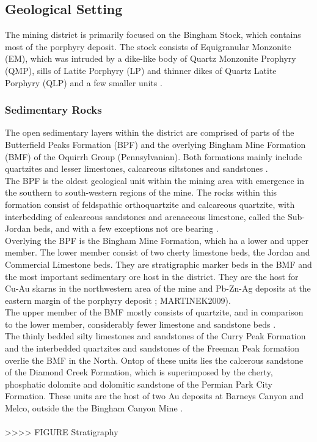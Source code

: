 \documentclass[a4paper,11pt,titlepage]{article}
\begin{document}
\subsection{Geological Setting}

The mining district is primarily focused on the Bingham Stock, which contains most of the porphyry deposit. The stock consists of Equigranular Monzonite (EM), which was intruded by a dike-like body of Quartz Monzonite Prophyry (QMP), sills of Latite Porphyry (LP) and thinner dikes of Quartz Latite Porphyry (QLP) and a few smaller units \citep{Porter2012}.

\subsubsection{Sedimentary Rocks}

The open sedimentary layers within the district are comprised of parts of the Butterfield Peaks Formation (BPF) and the overlying Bingham Mine Formation (BMF) of the Oquirrh Group (Pennsylvanian). Both formations mainly include quartzites and lesser limestones, calcareous siltstones and sandstones \citep{Lanier1978}.
\\The BPF is the oldest geological unit within the mining area with emergence in the southern to south-western regions of the mine. The rocks within this formation consist of feldspathic orthoquartzite and calcareous quartzite, with interbedding of calcareous sandstones and arenaceous limestone, called the Sub-Jordan beds, and with a few exceptions not ore bearing \citep{Lanier1978}.
\\Overlying the BPF is the Bingham Mine Formation, which ha a lower and upper member. The lower member consist of two cherty limestone beds, the Jordan and Commercial Limestone beds. They are stratigraphic marker beds in the BMF and the most important sedimentary ore host in the district. They are the host for Cu-Au skarns in the northwestern area of the mine and Pb-Zn-Ag deposits at the eastern margin of the porphyry deposit \citep{Lanier1978}; MARTINEK2009).
\\The upper member of the BMF mostly consists of quartzite, and in comparison to the lower member, considerably fewer limestone and sandstone beds \citep{Lanier1978}.
\\The thinly bedded silty limestones and sandstones of the Curry Peak Formation and the interbedded quartzites and sandstones of the Freeman Peak formation overlie the BMF in the North. Ontop of these units lies the calcerous sandstone of the Diamond Creek Formation, which is superimposed by the cherty, phosphatic dolomite and dolomitic sandstone of the Permian Park City Formation. These units are the host of two Au deposits at Barneys Canyon and Melco, outside the the Bingham Canyon Mine \citep{Babcock1995}.
\\
\\>>>> FIGURE Stratigraphy
\end{document}
